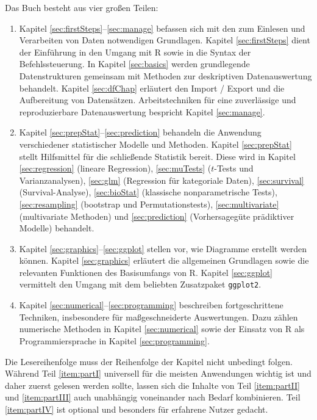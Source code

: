 Das Buch besteht aus vier großen Teilen:
\begin{enumerate}[label=\Roman*]
\item \label{item:partI} Kapitel \ref{sec:firstSteps}--\ref{sec:manage} befassen sich mit den zum Einlesen und Verarbeiten von Daten notwendigen Grundlagen. Kapitel \ref{sec:firstSteps} dient der Einführung in den Umgang mit R sowie in die Syntax der Befehlssteuerung. In Kapitel \ref{sec:basics} werden grundlegende Datenstrukturen gemeinsam mit Methoden zur deskriptiven Datenauswertung behandelt. Kapitel \ref{sec:dfChap} erläutert den Import / Export und die Aufbereitung von Datensätzen. Arbeitstechniken für eine zuverlässige und reproduzierbare Datenauswertung bespricht Kapitel \ref{sec:manage}.
\item \label{item:partII} Kapitel \ref{sec:prepStat}--\ref{sec:prediction} behandeln die Anwendung verschiedener statistischer Modelle und Methoden. Kapitel \ref{sec:prepStat} stellt Hilfsmittel für die schließende Statistik bereit. Diese wird in Kapitel \ref{sec:regression} (lineare Regression), \ref{sec:muTests} ($t$-Tests und Varianzanalysen), \ref{sec:glm} (Regression für kategoriale Daten), \ref{sec:survival} (Survival-Analyse), \ref{sec:bioStat} (klassische nonparametrische Tests), \ref{sec:resampling} (bootstrap und Permutationstests), \ref{sec:multivariate} (multivariate Methoden) und \ref{sec:prediction} (Vorhersagegüte prädiktiver Modelle) behandelt.
\item \label{item:partIII} Kapitel \ref{sec:graphics}--\ref{sec:ggplot} stellen vor, wie Diagramme erstellt werden können. Kapitel \ref{sec:graphics} erläutert die allgemeinen Grundlagen sowie die relevanten Funktionen des Basisumfangs von R. Kapitel \ref{sec:ggplot} vermittelt den Umgang mit dem beliebten Zusatzpaket \lstinline!ggplot2!.
\item \label{item:partIV} Kapitel \ref{sec:numerical}--\ref{sec:programming} beschreiben fortgeschrittene Techniken, insbesondere für maßgeschneiderte Auswertungen. Dazu zählen numerische Methoden in Kapitel \ref{sec:numerical} sowie der Einsatz von R als Programmiersprache in Kapitel \ref{sec:programming}.
\end{enumerate}

Die Lesereihenfolge muss der Reihenfolge der Kapitel nicht unbedingt folgen. Während Teil \ref{item:partI} universell für die meisten Anwendungen wichtig ist und daher zuerst gelesen werden sollte, lassen sich die Inhalte von Teil \ref{item:partII} und \ref{item:partIII} auch unabhängig voneinander nach Bedarf kombinieren. Teil \ref{item:partIV} ist optional und besonders für erfahrene Nutzer gedacht.


